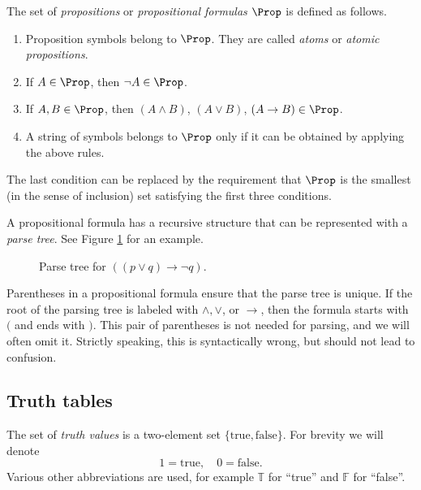 \begin{page}

\begin{dfn}
\label{dfn:PropForm}
The set of \emph{propositions} or \emph{propositional formulas} $\Prop$ is defined as follows.
\begin{enumerate}
\item
Proposition symbols belong to $\Prop$. They are called \emph{atoms} or \emph{atomic propositions}.
\item
If $A \in \Prop$, then $\neg A \in \Prop$.
\item
If $A, B \in \Prop$, then $(A \wedge B)$, $(A \vee B)$, $(A \to B) \in \Prop$.
\item
A string of symbols belongs to $\Prop$ only if it can be obtained by applying the above rules.
\end{enumerate}
\end{dfn}

\end{page}

\begin{page}

The last condition can be replaced by the requirement that $\Prop$ is the smallest (in the sense of inclusion) set satisfying the first three conditions.

A propositional formula has a recursive structure that can be represented with a \emph{parse tree}.
See Figure \ref{fig:ParseTreeProp} for an example.

\begin{figure}[ht]
\begin{center}

\end{center}
\caption{Parse tree for $((p \vee q) \to \neg q)$.}
\label{fig:ParseTreeProp}
\end{figure}

Parentheses in a propositional formula ensure that the parse tree is unique.
If the root of the parsing tree is labeled with $\wedge, \vee$, or $\to$, then the formula starts with $($ and ends with $)$.
This pair of parentheses is not needed for parsing, and we will often omit it.
Strictly speaking, this is syntactically wrong, but should not lead to confusion.



\end{page}

\begin{page}

\subsection{Truth tables}
The set of \emph{truth values} is a two-element set $\{\text{true}, \text{false}\}$.
For brevity we will denote
\[
1 = \text{true}, \quad 0 = \text{false}.
\]
Various other abbreviations are used, for example $\mathbb{T}$ for ``true'' and $\mathbb{F}$ for ``false''.


\end{page}

